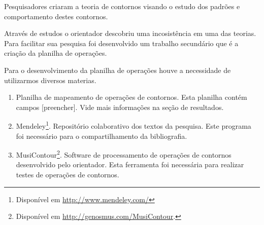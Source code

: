 \documentclass[11pt]{article}
\begin{document}
Pesquisadores criaram a teoria de contornos visando o estudo dos padrões e
comportamento destes contornos.

Através de estudos o orientador descobriu uma incosistência em uma das teorias.
Para facilitar sua pesquisa foi desenvolvido um trabalho secundário que é a
criação da planilha de operações.


\label{sec:materiais}

Para o desenvolvimento da planilha de operações houve a necessidade de
utilizarmos diversos materias.


\begin{enumerate}
\item Planilha de mapeamento de operações de contornos. Esta planilha
  contém campos [preencher]. Vide mais informações na seção de
  resultados.
\item Mendeley\footnote{Disponível em
    \url{http://www.mendeley.com/}}. Repositório colaborativo dos
  textos da pesquisa. Este programa foi necessário para o
  compartilhamento da bibliografia.
\item MusiContour\footnote{Disponível em
    \url{http://genosmus.com/MusiContour}.}. Software de processamento
  de operações de contornos desenvolvido pelo orientador. Esta
  ferramenta foi necessária para realizar testes de operações de
  contornos.
\end{enumerate}
\end{document}

